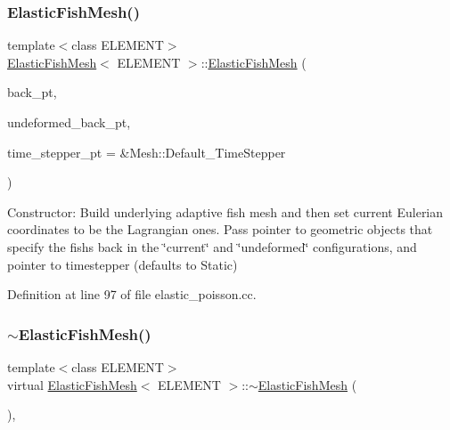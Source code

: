 \subsubsection{\texorpdfstring{Elastic\+Fish\+Mesh()}{ElasticFishMesh()}\hspace{0.1cm}{\footnotesize\ttfamily [2/2]}}
{\footnotesize\ttfamily template$<$class E\+L\+E\+M\+E\+NT$>$ \\
\hyperlink{classElasticFishMesh}{Elastic\+Fish\+Mesh}$<$ E\+L\+E\+M\+E\+NT $>$\+::\hyperlink{classElasticFishMesh}{Elastic\+Fish\+Mesh} (\begin{DoxyParamCaption}\item[{Geom\+Object $\ast$}]{back\+\_\+pt,  }\item[{Geom\+Object $\ast$}]{undeformed\+\_\+back\+\_\+pt,  }\item[{Time\+Stepper $\ast$}]{time\+\_\+stepper\+\_\+pt = {\ttfamily \&Mesh\+:\+:Default\+\_\+TimeStepper} }\end{DoxyParamCaption})\hspace{0.3cm}{\ttfamily [inline]}}



Constructor\+: Build underlying adaptive fish mesh and then set current Eulerian coordinates to be the Lagrangian ones. Pass pointer to geometric objects that specify the fish\textquotesingle{}s back in the \char`\"{}current\char`\"{} and \char`\"{}undeformed\char`\"{} configurations, and pointer to timestepper (defaults to Static) 



Definition at line 97 of file elastic\+\_\+poisson.\+cc.

\mbox{\label{classElasticFishMesh_ab8e084bb7551b9765b95dc38e82ab1be}} 
\subsubsection{\texorpdfstring{$\sim$\+Elastic\+Fish\+Mesh()}{~ElasticFishMesh()}\hspace{0.1cm}{\footnotesize\ttfamily [2/2]}}
{\footnotesize\ttfamily template$<$class E\+L\+E\+M\+E\+NT$>$ \\
virtual \hyperlink{classElasticFishMesh}{Elastic\+Fish\+Mesh}$<$ E\+L\+E\+M\+E\+NT $>$\+::$\sim$\hyperlink{classElasticFishMesh}{Elastic\+Fish\+Mesh} (\begin{DoxyParamCaption}{ }\end{DoxyParamCaption})\hspace{0.3cm}{\ttfamily [inline]}, {\ttfamily [virtual]}}



